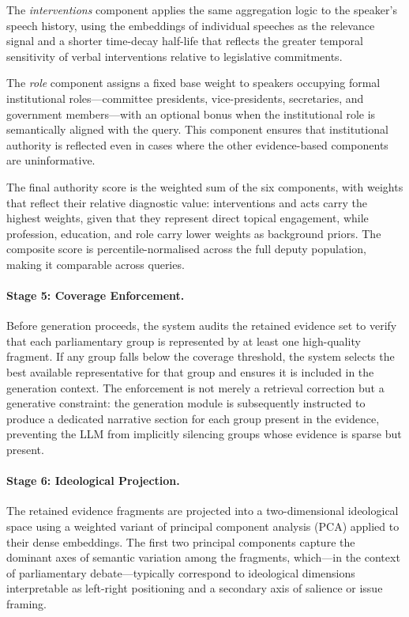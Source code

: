 The \textit{interventions} component applies the same aggregation logic to the speaker's
speech history, using the embeddings of individual speeches as the relevance signal and a
shorter time-decay half-life that reflects the greater temporal sensitivity of verbal
interventions relative to legislative commitments.

The \textit{role} component assigns a fixed base weight to speakers occupying formal
institutional roles---committee presidents, vice-presidents, secretaries, and government
members---with an optional bonus when the institutional role is semantically aligned with
the query. This component ensures that institutional authority is reflected even in cases
where the other evidence-based components are uninformative.

The final authority score is the weighted sum of the six components, with weights that
reflect their relative diagnostic value: interventions and acts carry the highest weights,
given that they represent direct topical engagement, while profession, education, and role
carry lower weights as background priors. The composite score is percentile-normalised
across the full deputy population, making it comparable across queries.

\paragraph{Stage 5: Coverage Enforcement.}
Before generation proceeds, the system audits the retained evidence set to verify that
each parliamentary group is represented by at least one high-quality fragment. If any
group falls below the coverage threshold, the system selects the best available representative
for that group and ensures it is included in the generation context. The enforcement is
not merely a retrieval correction but a generative constraint: the generation module is
subsequently instructed to produce a dedicated narrative section for each group present
in the evidence, preventing the LLM from implicitly silencing groups whose evidence is
sparse but present.

\paragraph{Stage 6: Ideological Projection.}
The retained evidence fragments are projected into a two-dimensional ideological space
using a weighted variant of principal component analysis (PCA) applied to their dense
embeddings. The first two principal components capture the dominant axes of semantic
variation among the fragments, which---in the context of parliamentary debate---typically
correspond to ideological dimensions interpretable as left-right positioning and a secondary
axis of salience or issue framing.

